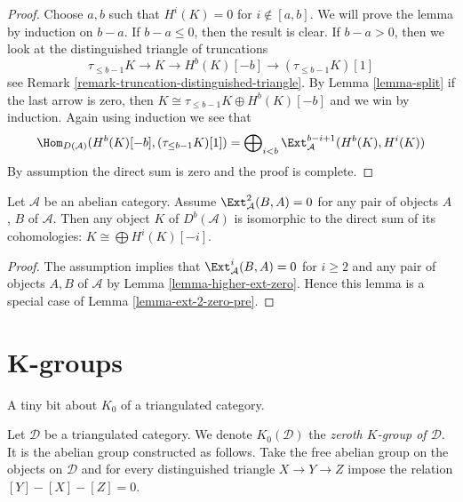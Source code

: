 \begin{proof}
Choose $a, b$ such that $H^i(K) = 0$ for $i \not \in [a, b]$.
We will prove the lemma by induction on $b - a$. If $b - a \leq 0$,
then the result is clear. If $b - a > 0$, then we look at the
distinguished triangle of truncations
$$
\tau_{\leq b - 1}K \to K \to H^b(K)[-b] \to (\tau_{\leq b - 1}K)[1]
$$
see Remark \ref{remark-truncation-distinguished-triangle}.
By Lemma \ref{lemma-split} if the last arrow is zero, then
$K \cong \tau_{\leq b - 1}K \oplus H^b(K)[-b]$ and we win
by induction. Again using induction we see that
$$
\Hom_{D(\mathcal{A})}(H^b(K)[-b], (\tau_{\leq b - 1}K)[1]) =
\bigoplus\nolimits_{i < b} \Ext_\mathcal{A}^{b - i + 1}(H^b(K), H^i(K))
$$
By assumption the direct sum is zero and the proof is complete.
\end{proof}

\begin{lemma}
\label{lemma-ext-2-zero}
Let $\mathcal{A}$ be an abelian category. Assume $\Ext^2_\mathcal{A}(B, A) = 0$
for any pair of objects $A$, $B$ of $\mathcal{A}$.
Then any object $K$ of $D^b(\mathcal{A})$ is isomorphic to the direct
sum of its cohomologies: $K \cong \bigoplus H^i(K)[-i]$.
\end{lemma}

\begin{proof}
The assumption implies that $\Ext^i_\mathcal{A}(B, A) = 0$ for $i \geq 2$
and any pair of objects $A, B$ of $\mathcal{A}$ by
Lemma \ref{lemma-higher-ext-zero}. Hence this lemma is a special
case of Lemma \ref{lemma-ext-2-zero-pre}.
\end{proof}






\section{K-groups}
\label{section-K-groups}

\noindent
A tiny bit about $K_0$ of a triangulated category.

\begin{definition}
\label{definition-K-zero}
Let $\mathcal{D}$ be a triangulated category. We denote $K_0(\mathcal{D})$ the
{\it zeroth $K$-group of $\mathcal{D}$}. It is the abelian group constructed
as follows. Take the free abelian group on the objects on $\mathcal{D}$
and for every distinguished triangle $X \to Y \to Z$
impose the relation $[Y] - [X] - [Z] = 0$.
\end{definition}

